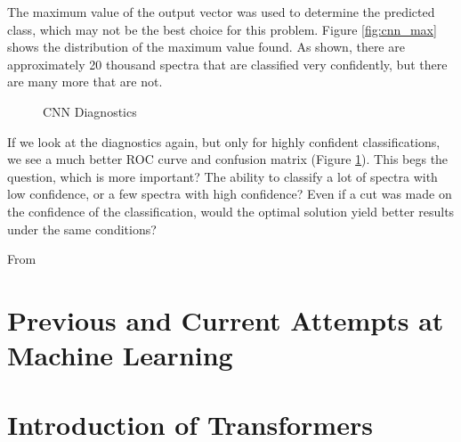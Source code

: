 The maximum value of the output vector was used to determine the predicted class,
which may not be the best choice for this problem. Figure \ref{fig:cnn_max} shows
the distribution of the maximum value found. As shown, there are approximately 
20 thousand spectra that are classified very confidently, but there are many
more that are not.
\begin{figure}[h]
    \centering
    \qquad
    \caption{CNN Diagnostics}
    \label{fig:cnn_qual2}
\end{figure} 

If we look at the diagnostics again, but only for highly confident classifications,
we see a much better ROC curve and confusion matrix (Figure \ref{fig:cnn_qual2}). 
This begs the question, which is more important? The ability to classify a lot of 
spectra with low confidence, or a few spectra with high confidence? Even if a 
cut was made on the confidence of the classification, would the optimal solution
yield better results under the same conditions? 

From

\section{Previous and Current Attempts at Machine Learning}
\label{sec:previousML}

\section{Introduction of Transformers}
\label{sec:transformers}

